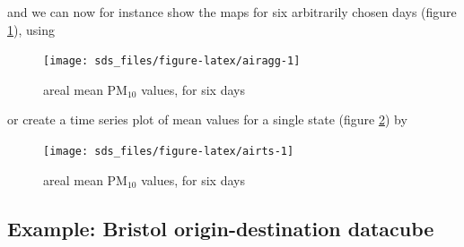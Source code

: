 \documentclass[]{book}
\newenvironment{Shaded}{\begin{snugshade}}{\end{snugshade}}
\newcommand{\DataTypeTok}[1]{\textcolor[rgb]{0.13,0.29,0.53}{#1}}
\newcommand{\DecValTok}[1]{\textcolor[rgb]{0.00,0.00,0.81}{#1}}
\newcommand{\KeywordTok}[1]{\textcolor[rgb]{0.13,0.29,0.53}{\textbf{#1}}}
\newcommand{\NormalTok}[1]{#1}
\newcommand{\OperatorTok}[1]{\textcolor[rgb]{0.81,0.36,0.00}{\textbf{#1}}}
\newcommand{\StringTok}[1]{\textcolor[rgb]{0.31,0.60,0.02}{#1}}
\begin{document}
and we can now for instance show the maps for six arbitrarily chosen days
(figure \ref{fig:airagg}), using

\begin{Shaded}
\end{Shaded}

\begin{figure}

{\centering \texttt{[image: sds\_files/figure-latex/airagg-1]} 

}

\caption{areal mean PM$_{10}$ values, for six days}\label{fig:airagg}
\end{figure}

or create a time series plot of mean values for a single state
(figure \ref{fig:airts}) by

\begin{Shaded}
\end{Shaded}

\begin{figure}

{\centering \texttt{[image: sds\_files/figure-latex/airts-1]} 

}

\caption{areal mean PM$_{10}$ values, for six days}\label{fig:airts}
\end{figure}

\hypertarget{example-bristol-origin-destination-datacube}{%
\subsection{Example: Bristol origin-destination datacube}\label{example-bristol-origin-destination-datacube}}
\end{document}
